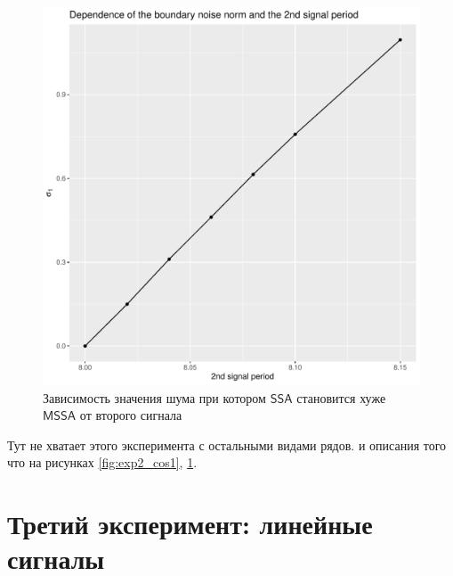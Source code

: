 \documentclass[specialist, substylefile = spbureport.rtx,
    subf,href,colorlinks=true, 12pt]{disser}
\newcommand{\SSA}{\mathsf{SSA}}
\newcommand{\MSSA}{\mathsf{MSSA}}
\begin{document}
\begin{figure}
\begin{minipage}{.5\textwidth}
            \includegraphics[width=\textwidth]{experiment_2_cos2.pdf}
            \caption{Зависимость значения шума при котором $\SSA$ становится хуже $\MSSA$ от второго сигнала}
            \label{fig:exp2_cos2}
            \end{minipage}
        \end{figure}






        Тут не хватает этого эксперимента с остальными видами рядов.
        и описания того что на рисунках \ref{fig:exp2_cos1}, \ref{fig:exp2_cos2}.

    \section{Третий эксперимент: линейные сигналы}
\end{document}
